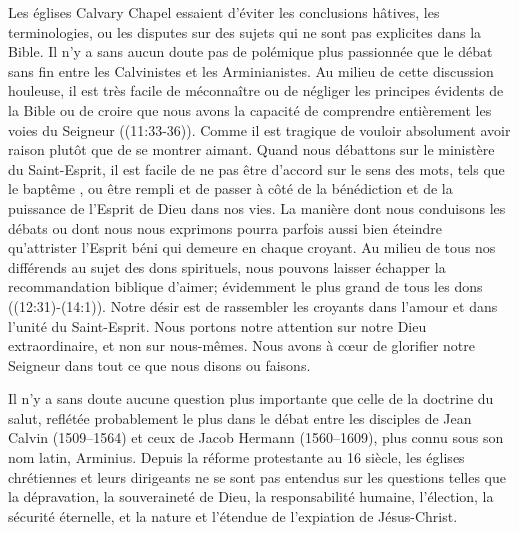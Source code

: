 Les églises Calvary Chapel essaient \pocketlinebreak
 d'éviter les conclusions hâtives, les terminologies,
 ou les disputes
 sur des sujets qui ne sont pas explicites dans la Bible.
 Il n'y a sans aucun doute pas de polémique plus passionnée que le débat sans fin
 entre les Calvinistes et les Arminianistes. Au milieu de cette discussion houleuse,
 il est très facile de méconnaître ou de négliger les principes évidents de la Bible
 ou de croire que nous avons la capacité de comprendre entièrement les voies du Seigneur
 ((11:33-36)).
 Comme il est tragique de vouloir absolument avoir raison plutôt que de se montrer aimant.
 Quand nous débattons sur le ministère du Saint-Esprit, il est facile de ne pas être d'accord
 sur le sens des mots, tels que le \og baptême \fg{}, ou \og être rempli \fg{} 
 et de passer à côté de la bénédiction et de la puissance de l'Esprit de Dieu dans nos vies.
 La manière dont nous conduisons les débats ou dont nous nous exprimons pourra parfois
 aussi bien \og éteindre \fg{}  qu'\og attrister\fg{} 
 l'Esprit béni qui demeure en chaque croyant.
 Au milieu de tous nos différends au sujet des dons spirituels,
 nous pouvons laisser échapper la recommandation biblique d'aimer;
 évidemment le plus grand de tous les dons ((12:31)-(14:1)).
 Notre désir est de rassembler les croyants dans l'amour et dans l'unité du Saint-Esprit.
 Nous portons notre attention sur notre Dieu extraordinaire, et non sur
 nous-mêmes.
 Nous avons à cœur de glorifier notre Seigneur dans tout ce que nous disons ou faisons.

Il n'y a sans doute aucune question plus importante que celle de la doctrine du salut,
 reflétée probablement le plus dans le débat entre les disciples de Jean Calvin (1509--1564)
 et ceux de Jacob Hermann \pocketlinebreak (1560--1609), plus connu sous son nom latin, Arminius.
 Depuis la réforme protestante au 16 siècle, les églises chrétiennes
 et leurs dirigeants ne se sont pas entendus sur les questions telles que la dépravation,
 la souveraineté de Dieu, la responsabilité humaine, l'élection, la sécurité éternelle,
 et la nature et l'étendue de l'expiation de Jésus-Christ.


